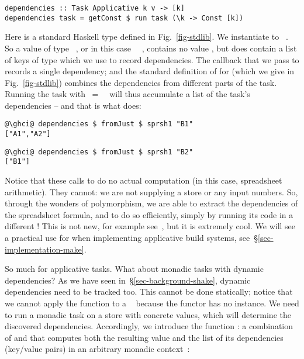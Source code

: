 \vspace{1mm}
\begin{verbatim}
dependencies :: Task Applicative k v -> [k]
dependencies task = getConst $ run task (\k -> Const [k])
\end{verbatim}
\vspace{1mm}

\noindent
Here  is a standard Haskell type defined in Fig.~\ref{fig-stdlib}. We
instantiate  to ~\hs{[@@k]}. So a value of type ~,
or in this case ~\hs{[@@k]}~, contains no value , but does
contain a list of keys of type \hs{[@@k]} which we use to record dependencies.
The  callback that we pass to  records a single dependency;
and the standard definition of  for  (which we give
in Fig.~\ref{fig-stdlib}) combines the dependencies from different parts of the
task. Running the task with ~=~~\hs{[@@k]} will thus
accumulate a list of the task's dependencies -- and that is what
 does:
\vspace{1mm}
\begin{verbatim}
@\ghci@ dependencies $ fromJust $ sprsh1 "B1"
["A1","A2"]
\end{verbatim}
\begin{verbatim}
@\ghci@ dependencies $ fromJust $ sprsh1 "B2"
["B1"]
\end{verbatim}
\vspace{1mm}

\noindent
Notice that these calls to  do no actual computation (in this
case, spreadsheet arithmetic). They cannot: we are not supplying a store or any
input numbers. So, through the wonders of polymorphism, we are able to extract
the dependencies of the spreadsheet formula, and to do so efficiently, simply by
running its code in a different ! This is not new, for example
see~\cite{free-applicatives}, but it is extremely cool. We will see a practical
use for  when implementing applicative build systems,
see~\S\ref{sec-implementation-make}.

So much for applicative tasks. What about monadic tasks with dynamic
dependencies? As we have seen in~\S\ref{sec-background-shake}, dynamic
dependencies need to be tracked too. This cannot be done statically; notice that
we cannot apply the function  to a ~ because
the  functor has no  instance. We need to run a monadic task
on a store with concrete values, which will determine the discovered
dependencies. Accordingly, we introduce the function : a combination
of  and  that computes both the resulting value and
the list of its dependencies (key/value pairs) in an arbitrary monadic
context~:

